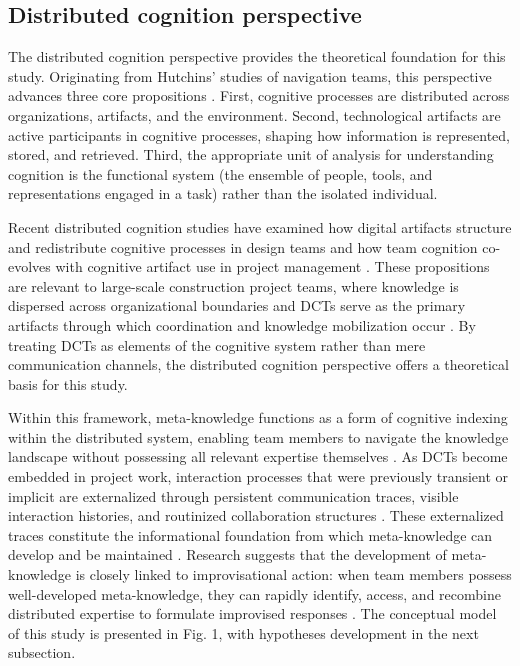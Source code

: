 \documentclass[authoryear,preprint,review,times,10pt]{elsarticle}
\begin{document}
\subsection{Distributed cognition perspective}
The distributed cognition perspective provides the theoretical foundation for this study. Originating from Hutchins' studies of navigation teams, this perspective advances three core propositions \citep{hutchins2020Distributed, hollan2000Distributed}. First, cognitive processes are distributed across organizations, artifacts, and the environment. Second, technological artifacts are active participants in cognitive processes, shaping how information is represented, stored, and retrieved. Third, the appropriate unit of analysis for understanding cognition is the functional system (the ensemble of people, tools, and representations engaged in a task) rather than the isolated individual.  

Recent distributed cognition studies have examined how digital artifacts structure and redistribute cognitive processes in design teams \citep{mangalaraj2014Distributed, nemeth2004Using} and how team cognition co-evolves with cognitive artifact use in project management \citep{drury-grogan2021Changes}. These propositions are relevant to large-scale construction project teams, where knowledge is dispersed across organizational boundaries and DCTs serve as the primary artifacts through which coordination and knowledge mobilization occur \citep{leonardi2015Ambient, safadi2024Balancing}. By treating DCTs as elements of the cognitive system rather than mere communication channels, the distributed cognition perspective offers a theoretical basis for this study.

Within this framework, meta-knowledge functions as a form of cognitive indexing within the distributed system, enabling team members to navigate the knowledge landscape without possessing all relevant expertise themselves \citep{engelbrecht2019How, ye2021Leveraging}. As DCTs become embedded in project work, interaction processes that were previously transient or implicit are externalized through persistent communication traces, visible interaction histories, and routinized collaboration structures \citep{leonardi2014Social, treem2020ComputerMediated}. These externalized traces constitute the informational foundation from which meta-knowledge can develop and be maintained \citep{palazzolo2006Coevolution}. Research suggests that the development of meta-knowledge is closely linked to improvisational action: when team members possess well-developed meta-knowledge, they can rapidly identify, access, and recombine distributed expertise to formulate improvised responses \citep{huang2017Ties, oostervink2016Knowledge}. The conceptual model of this study is presented in Fig. 1, with hypotheses development in the next subsection.
\end{document}
